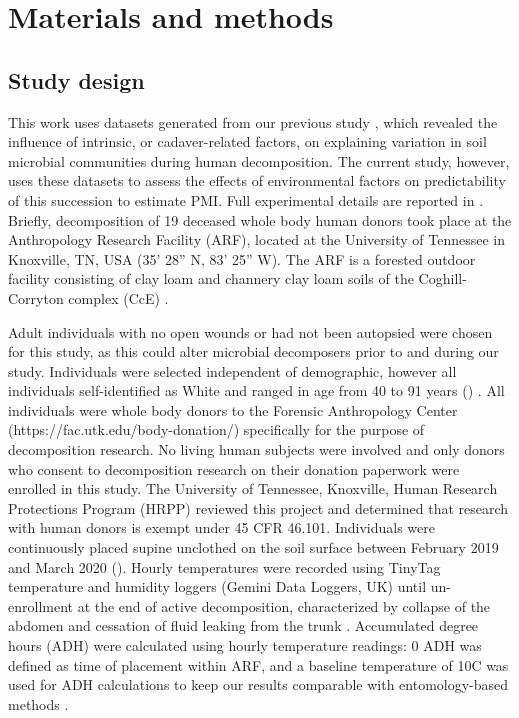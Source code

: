\documentclass[
  10pt,
  letterpaper,
]{article}
\begin{document}
\section{Materials and methods}\label{materials-and-methods}

\subsection{Study design}\label{study-design}

This work uses datasets generated from our previous study
\citep{mason_body_2022}, which revealed the influence of intrinsic, or
cadaver-related factors, on explaining variation in soil microbial
communities during human decomposition. The current study, however, uses
these datasets to assess the effects of environmental factors on
predictability of this succession to estimate PMI. Full experimental
details are reported in \citep{mason_body_2022}. Briefly, decomposition
of 19 deceased whole body human donors took place at the Anthropology
Research Facility (ARF), located at the University of Tennessee in
Knoxville, TN, USA (35' 28'' N, 83' 25'' W).
The ARF is a forested outdoor facility consisting of clay loam and
channery clay loam soils of the Coghill-Corryton complex (CcE)
\citep{keenan_spatial_2018, damann_potential_2015}.

Adult individuals with no open wounds or had not been autopsied were
chosen for this study, as this could alter microbial decomposers prior
to and during our study. Individuals were selected independent of
demographic, however all individuals self-identified as White and ranged
in age from 40 to 91 years () \citep{mason_body_2022}.
All individuals were whole body donors to the Forensic Anthropology
Center (https://fac.utk.edu/body-donation/) specifically for the purpose
of decomposition research. No living human subjects were involved and
only donors who consent to decomposition research on their donation
paperwork were enrolled in this study. The University of Tennessee,
Knoxville, Human Research Protections Program (HRPP) reviewed this
project and determined that research with human donors is exempt under
45 CFR 46.101. Individuals were continuously placed supine unclothed on
the soil surface between February 2019 and March 2020
(). Hourly temperatures were recorded using TinyTag
temperature and humidity loggers (Gemini Data Loggers, UK) until
un-enrollment at the end of active decomposition, characterized by
collapse of the abdomen and cessation of fluid leaking from the trunk
\citep{megyesi_using_2005}. Accumulated degree hours (ADH) were
calculated using hourly temperature readings: 0 ADH was defined as time
of placement within ARF, and a baseline temperature of 10\textdegree C
was used for ADH calculations to keep our results comparable with
entomology-based methods \citep{byrd_development_2001}.
\end{document}
